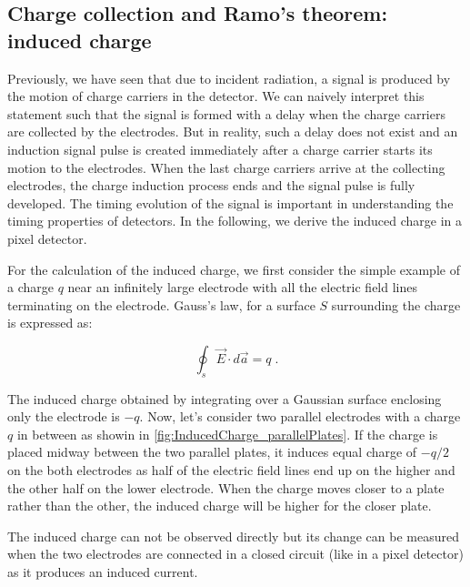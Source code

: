 \subsection{Charge collection and Ramo's theorem: induced charge}
\label{sec:RamoTheorem}

Previously, we have seen that due to incident radiation, a signal is
produced by the motion of charge carriers in the detector. We can
naively interpret this statement such that the signal is formed with a
delay when the charge carriers are collected by the electrodes. But in
reality, such a delay does not exist and an induction signal pulse is
created immediately after a charge carrier starts its motion to the
electrodes. When the last charge carriers arrive at the collecting
electrodes, the charge induction process ends and the signal pulse is
fully developed. The timing evolution of the signal is important in
understanding the timing properties of detectors. In the following, we
derive the induced charge in a pixel detector.

For the calculation of the induced charge, we first consider the
simple example of a charge $q$ near an infinitely large electrode with
all the electric field lines terminating on the electrode. Gauss's
law, for a surface $S$ surrounding the charge is expressed as:

\begin{equation}
\oint_{s} \vec{E} \cdot d\vec{a}=q\; .
\label{eq:GaussLaw}
\end{equation}

The induced charge obtained by integrating over a Gaussian surface
enclosing only the electrode is $-q$. Now, let's consider two parallel
electrodes with a charge $q$ in between as showin in
\cref{fig:InducedCharge_parallelPlates}. If the charge is placed
midway between the two parallel plates, it induces equal charge of
$-q/2$ on the both electrodes as half of the electric field lines end
up on the higher and the other half on the lower electrode. When the
charge moves closer to a plate rather than the other, the induced
charge will be higher for the closer plate.

The induced charge can not be observed directly but its change can be
measured when the two electrodes are connected in a closed circuit
(like in a pixel detector) as it produces an induced current.

